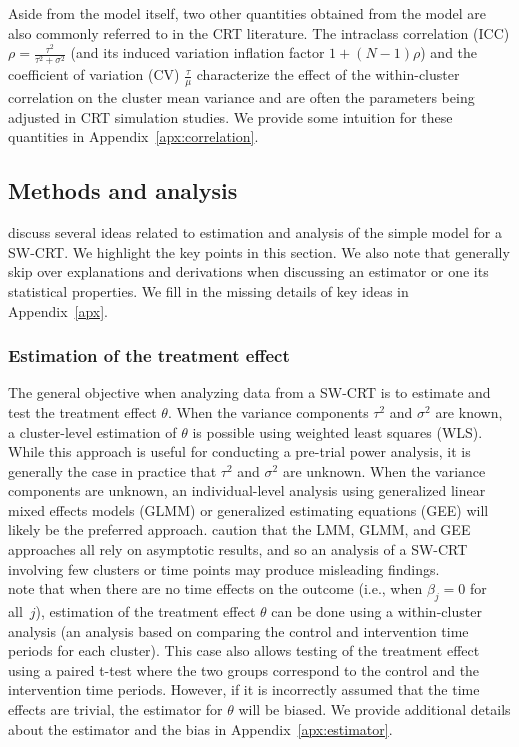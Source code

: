 \documentclass[10pt]{article}
\begin{document}
Aside from the model itself, two other quantities obtained from the model are also commonly referred to in the CRT literature. The intraclass correlation (ICC) $\rho=\frac{\tau^2}{\tau^2+\sigma^2}$ (and its induced variation inflation factor $1+(N-1)\rho$) and the coefficient of variation (CV) $\frac{\tau}{\mu}$ characterize the effect of the within-cluster correlation on the cluster mean variance and are often the parameters being adjusted in CRT simulation studies. We provide some intuition for these quantities in Appendix~\ref{apx:correlation}.


\subsection{Methods and analysis}

\textcite{Hussey:2007} discuss several ideas related to estimation and analysis of the simple model for a SW-CRT. We highlight the key points in this section. We also note that \citeauthor{Hussey:2007} generally skip over explanations and derivations when discussing an estimator or one its statistical properties. We fill in the missing details of key ideas in Appendix~\ref{apx}.

\subsubsection{Estimation of the treatment effect}

The general objective when analyzing data from a SW-CRT is to estimate and test the treatment effect $\theta$. When the variance components $\tau^2$ and $\sigma^2$ are known, a cluster-level estimation of $\theta$ is possible using weighted least squares (WLS). While this approach is useful for conducting a pre-trial power analysis, it is generally the case in practice that $\tau^2$ and $\sigma^2$ are unknown. When the variance components are unknown, an individual-level analysis using generalized linear mixed effects models (GLMM) or generalized estimating equations (GEE) will likely be the preferred approach. \citeauthor{Hussey:2007} caution that the LMM, GLMM, and GEE approaches all rely on asymptotic results, and so an analysis of a SW-CRT involving few clusters or time points may produce misleading findings.
\\

\citeauthor{Hussey:2007} note that when there are no time effects on the outcome (i.e., when $\beta_j=0$ for all~$j$), estimation of the treatment effect $\theta$ can be done using a within-cluster analysis (an analysis based on comparing the control and intervention time periods for each cluster). This case also allows testing of the treatment effect using a paired t-test where the two groups correspond to the control and the intervention time periods. However, if it is incorrectly assumed that the time effects are trivial, the estimator for $\theta$ will be biased. We provide additional details about the estimator and the bias in Appendix~\ref{apx:estimator}.
\\
\end{document}
